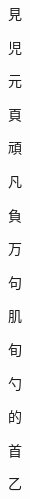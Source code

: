 \begin{spacing}{2.5}
{\Huge \begin{CJK}{UTF8}{min} 見\end{CJK}}\hspace{0.1cm}
{\Huge \begin{CJK}{UTF8}{min} 児\end{CJK}}\hspace{0.1cm}
{\Huge \begin{CJK}{UTF8}{min} 元\end{CJK}}\hspace{0.1cm}
{\Huge \begin{CJK}{UTF8}{min} 頁\end{CJK}}\hspace{0.1cm}
{\Huge \begin{CJK}{UTF8}{min} 頑\end{CJK}}\hspace{0.1cm}
{\Huge \begin{CJK}{UTF8}{min} 凡\end{CJK}}\hspace{0.1cm}
{\Huge \begin{CJK}{UTF8}{min} 負\end{CJK}}\hspace{0.1cm}
{\Huge \begin{CJK}{UTF8}{min} 万\end{CJK}}\hspace{0.1cm}
{\Huge \begin{CJK}{UTF8}{min} 句\end{CJK}}\hspace{0.1cm}
{\Huge \begin{CJK}{UTF8}{min} 肌\end{CJK}}\hspace{0.1cm}
{\Huge \begin{CJK}{UTF8}{min} 旬\end{CJK}}\hspace{0.1cm}
{\Huge \begin{CJK}{UTF8}{min} 勺\end{CJK}}\hspace{0.1cm}
{\Huge \begin{CJK}{UTF8}{min} 的\end{CJK}}\hspace{0.1cm}
{\Huge \begin{CJK}{UTF8}{min} 首\end{CJK}}\hspace{0.1cm}
{\Huge \begin{CJK}{UTF8}{min} 乙\end{CJK}}\hspace{0.1cm}

\end{spacing}
